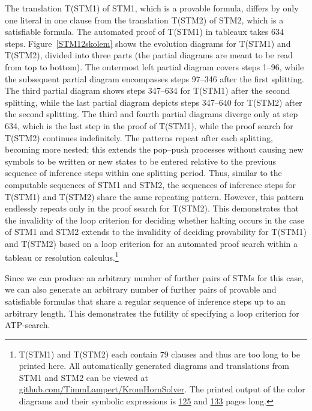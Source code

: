 \documentclass[%
  manuscript=article,   %
  year=2024,
  volume=77,
  doi=00000.000,
]{zfn}
\begin{document}
The translation T(STM1) of STM1, which is a provable formula, differs by only one literal in one clause from the translation T(STM2) of STM2, which is a satisfiable formula. The automated proof of T(STM1) in tableaux takes 634 steps. Figure~\ref{STM12skolem} shows the evolution diagrams for T(STM1) and T(STM2), divided into three parts (the partial diagrams are meant to be read from top to bottom). The outermost left partial diagram covers steps 1--96, while the subsequent partial diagram encompasses steps 97--346 after the first splitting. The third partial diagram shows steps 347--634 for T(STM1) after the second splitting, while the last partial diagram depicts steps 347--640 for T(STM2) after the second splitting. The third and fourth partial diagrams diverge only at step 634, which is the last step in the proof of T(STM1), while the proof search for T(STM2) continues indefinitely. The patterns repeat after each splitting, becoming more nested; this extends the pop--push processes without causing new symbols to be written or new states to be entered relative to the previous sequence of inference steps within one splitting period. Thus, similar to the computable sequences of STM1 and STM2, the sequences of inference steps for T(STM1) and T(STM2) share the same repeating pattern. However, this pattern endlessly repeats only in the proof search for T(STM2). This demonstrates that the invalidity of the loop criterion for deciding whether halting occurs in the case of STM1 and STM2 extends to the invalidity of deciding provability for T(STM1) and T(STM2) based on a loop criterion for an automated proof search within a tableau or resolution calculus.\footnote{T(STM1) and T(STM2) each contain 79 clauses and thus are too long to be printed here. All automatically generated diagrams and translations from STM1 and STM2 can be viewed at %
\href{https://github.com/TimmLampert/KromHornSolver}{github.com/TimmLampert/KromHornSolver}.%
\label{linkfoot} 
The printed output of the color diagrams and their symbolic expressions is 
\href{http://www2.cms.hu-berlin.de/newlogic/webMathematica/Logic/STM1.pdf}{125}
and 
\href{http://www2.cms.hu-berlin.de/newlogic/webMathematica/Logic/STM2.pdf}{133}
pages long.}

Since we can produce an arbitrary number of further pairs of STMs for this case, we can also generate an arbitrary number of further pairs of provable and satisfiable formulas that share a regular sequence of inference steps up to an arbitrary length. This demonstrates the futility of specifying a loop criterion for ATP-search.
\end{document}
